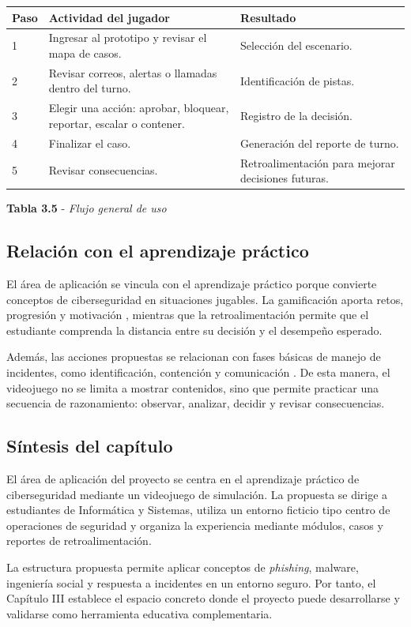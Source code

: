 \begin{center}

\vspace{0.2cm}
\begin{tabular}{|p{}|p{}|p{}|}
\hline
\textbf{Paso} & \textbf{Actividad del jugador} & \textbf{Resultado} \\
\hline
1 & Ingresar al prototipo y revisar el mapa de casos. & Selecci\'{o}n del escenario. \\
\hline
2 & Revisar correos, alertas o llamadas dentro del turno. & Identificaci\'{o}n de pistas. \\
\hline
3 & Elegir una acci\'{o}n: aprobar, bloquear, reportar, escalar o contener. & Registro de la decisi\'{o}n. \\
\hline
4 & Finalizar el caso. & Generaci\'{o}n del reporte de turno. \\
\hline
5 & Revisar consecuencias. & Retroalimentaci\'{o}n para mejorar decisiones futuras. \\
\hline
\end{tabular}

\textbf{Tabla 3.5} - \textit{Flujo general de uso}

\end{center}

\subsection{Relaci\'{o}n con el aprendizaje pr\'{a}ctico}

El \'{a}rea de aplicaci\'{o}n se vincula con el aprendizaje pr\'{a}ctico porque convierte conceptos de ciberseguridad en situaciones jugables. La gamificaci\'{o}n aporta retos, progresi\'{o}n y motivaci\'{o}n \parencite{kapp2012gamification}, mientras que la retroalimentaci\'{o}n permite que el estudiante comprenda la distancia entre su decisi\'{o}n y el desempe\~{n}o esperado.

Adem\'{a}s, las acciones propuestas se relacionan con fases b\'{a}sicas de manejo de incidentes, como identificaci\'{o}n, contenci\'{o}n y comunicaci\'{o}n \parencite{cichonski2022incident}. De esta manera, el videojuego no se limita a mostrar contenidos, sino que permite practicar una secuencia de razonamiento: observar, analizar, decidir y revisar consecuencias.

\subsection{S\'{i}ntesis del cap\'{i}tulo}

El \'{a}rea de aplicaci\'{o}n del proyecto se centra en el aprendizaje pr\'{a}ctico de ciberseguridad mediante un videojuego de simulaci\'{o}n. La propuesta se dirige a estudiantes de Inform\'{a}tica y Sistemas, utiliza un entorno ficticio tipo centro de operaciones de seguridad y organiza la experiencia mediante m\'{o}dulos, casos y reportes de retroalimentaci\'{o}n.

La estructura propuesta permite aplicar conceptos de \textit{phishing}, malware, ingenier\'{i}a social y respuesta a incidentes en un entorno seguro. Por tanto, el Cap\'{i}tulo III establece el espacio concreto donde el proyecto puede desarrollarse y validarse como herramienta educativa complementaria.
